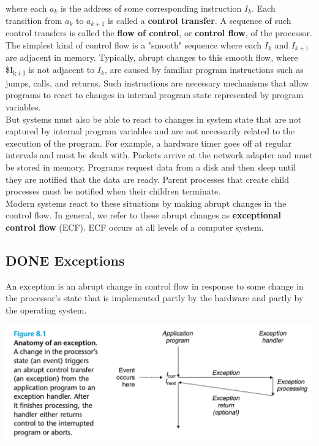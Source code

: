 \documentclass[11pt]{article}
\begin{document}
where each \(a_k\) is the address of some corresponding instruction \(I_k\). Each transition from \(a_k\) to \(a_{k+1}\) is called a \textbf{control transfer}. A sequence of such control transfers is called the \textbf{flow of control}, or \textbf{control flow}, of the processor.\\


The simplest kind of control flow is a "smooth" sequence where each \(I_k\) and \(I_{k+1}\) are adjacent in memory. Typically, abrupt changes to this smooth flow, where \$I\textsubscript{k+1} is not adjacent to \(I_k\), are caused by familiar program instructions such as jumps, calls, and returns. Such instructions are necessary mechanisms that allow programs to react to changes in internal program state represented by program variables.\\


But systems must also be able to react to changes in system state that are not captured by internal program variables and are not necessarily related to the execution of the program. For example, a hardware timer goes off at regular intervals and must be dealt with. Packets arrive at the network adapter and must be stored in memory. Programs request data from a disk and then sleep until they are notified that the data are ready. Parent processes that create child processes must be notified when their children terminate.\\


Modern systems react to these situations by making abrupt changes in the control flow. In general, we refer to these abrupt changes as \textbf{exceptional control flow} (ECF). ECF occurs at all levels of a computer system.\\


\subsection{{\bfseries\sffamily DONE} Exceptions}
\label{sec:org867833f}
An exception is an abrupt change in control flow in response to some change in the processor's state that is implemented partly by the hardware and partly by the operating system.\\

\begin{center}
\includegraphics[width=.9\linewidth]{pics/figure8.1-anatomy-of-an-exception.png}
\end{center}
\end{document}
